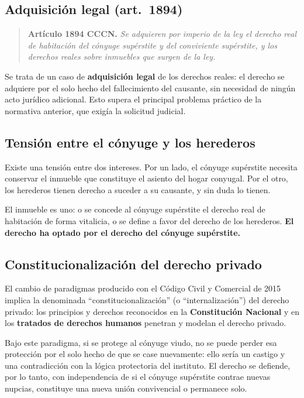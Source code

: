 \documentclass[12pt,oneside]{book}
\begin{document}
\subsection{Adquisición legal (art.~1894)}

\begin{quote}
\textbf{Artículo 1894 CCCN.} \textit{Se adquieren por imperio de la ley el derecho real de habitación del cónyuge supérstite y del conviviente supérstite, y los derechos reales sobre inmuebles que surgen de la ley.}
\end{quote}

Se trata de un caso de \textbf{adquisición legal} de los derechos reales: el derecho se adquiere por el solo hecho del fallecimiento del causante, sin necesidad de ningún acto jurídico adicional. Esto supera el principal problema práctico de la normativa anterior, que exigía la solicitud judicial.

\subsection{Tensión entre el cónyuge y los herederos}

Existe una tensión entre dos intereses. Por un lado, el cónyuge supérstite necesita conservar el inmueble que constituye el asiento del hogar conyugal. Por el otro, los herederos tienen derecho a suceder a su causante, y sin duda lo tienen.

\begin{important}
El inmueble es uno: o se concede al cónyuge supérstite el derecho real de habitación de forma vitalicia, o se define a favor del derecho de los herederos. \textbf{El derecho ha optado por el derecho del cónyuge supérstite.}
\end{important}

\subsection{Constitucionalización del derecho privado}

El cambio de paradigmas producido con el Código Civil y Comercial de 2015 implica la denominada ``constitucionalización'' (o ``internalización'') del derecho privado: los principios y derechos reconocidos en la \textbf{Constitución Nacional} y en los \textbf{tratados de derechos humanos} penetran y modelan el derecho privado.

Bajo este paradigma, si se protege al cónyuge viudo, no se puede perder esa protección por el solo hecho de que se case nuevamente: ello sería un castigo y una contradicción con la lógica protectoria del instituto. El derecho se defiende, por lo tanto, con independencia de si el cónyuge supérstite contrae nuevas nupcias, constituye una nueva unión convivencial o permanece solo.
\end{document}
